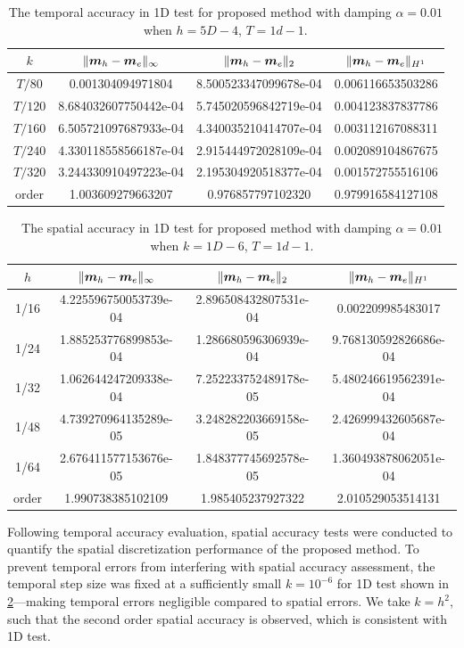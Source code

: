 \documentclass[preprint,times,3p]{elsarticle}
\def\m{\mbox{\boldmath $m$}}
\begin{document}
\begin{table}[htbp]
	\centering
	\caption{The temporal accuracy in 1D test for proposed method with damping $\alpha=0.01$when $h = 5D-4$, $T=1d-1$.}\label{tab-a-v-3}
	\begin{tabular}{|c|c|c|c|}
		\hline
		$k$ & $\|\m_h-\m_e\|_\infty$ & $\|\m_h-\m_e\|_2$ &$\|\m_h-\m_e\|_{H^1}$\\
		\hline
		$T/80$ &0.001304094971804&8.500523347099678e-04&0.006116653503286 \\
		$T/120$ &8.684032607750442e-04&5.745020596842719e-04&0.004123837837786 \\
		$T/160$ &6.505721097687933e-04&4.340035210414707e-04&0.003112167088311 \\
		$T/240$ &4.330118558566187e-04&2.915444972028109e-04&0.002089104867675 \\
		$T/320$ &3.244330910497223e-04&2.195304920518377e-04&0.001572755516106 \\
		\hline 
		order &1.003609279663207&0.976857797102320&0.979916584127108\\
		\hline
	\end{tabular}
\end{table}

\begin{table}[htbp]
	\centering
	\caption{The spatial accuracy in 1D test for proposed method with damping $\alpha=0.01$ when $k= 1D-6$, $T=1d-1$.}\label{tab-a-10-space-Q-1}
	\begin{tabular}{|c|c|c|c|}
		\hline
		$h$ & $\|\m_h-\m_e\|_\infty$ & $\|\m_h-\m_e\|_2$ &$\|\m_h-\m_e\|_{H^1}$ \\
		\hline
		1/16 &4.225596750053739e-04&2.896508432807531e-04&0.002209985483017 \\
		1/24 &1.885253776899853e-04&1.286680596306939e-04&9.768130592826686e-04\\
		1/32 &1.062644247209338e-04&7.252233752489178e-05&5.480246619562391e-04\\
		1/48 &4.739270964135289e-05
		&3.248282203669158e-05&2.426999432605687e-04\\
		1/64 &2.676411577153676e-05&1.848377745692578e-05&1.360493878062051e-04\\
		\hline 
		order &1.990738385102109&1.985405237927322&2.010529053514131 \\
		\hline
	\end{tabular}
\end{table}

Following temporal accuracy evaluation, spatial accuracy tests were conducted to quantify the spatial discretization performance of the proposed method. To prevent temporal errors from interfering with spatial accuracy assessment, the temporal step size was fixed at a sufficiently small \(k=10^{-6}\) for 1D test shown in \cref{tab-a-10-space-Q-1}—making temporal errors negligible compared to spatial errors. We take $k=h^2$, such that the second order spatial accuracy is observed, which is consistent with 1D test.
\end{document}
